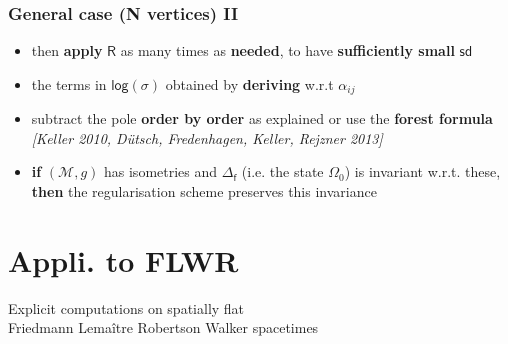 \documentclass[9pt]{beamer}
\newcommand{\logar}{\mathsf{log}} %
\newcommand{\sd}{\mathsf{sd}} %
\newcommand{\citebeam}[1]{\textit{\textcolor{black!60!white}{[#1]}}} %
\newcommand{\Mcal}{\mathcal{M}}
\newcommand{\Rsf}{\mathsf{R}}
\newcommand{\fsf}{\mathsf{f}}
\begin{document}
\begin{frame}
 
\frametitle{General case (N vertices) II}

\begin{itemize}
 
\item then \textbf{apply} $\Rsf$ as many times as \textbf{needed}, to have \textbf{sufficiently small} $\sd$ 

\item the terms in $\logar(\sigma)$ obtained by \textbf{deriving} w.r.t $\alpha_{ij}$

\item subtract the pole \textbf{order by order} as explained or use the \textbf{forest formula} \\
\citebeam{Keller 2010, Dütsch, Fredenhagen, Keller, Rejzner 2013}

\item \textbf{if} $(\Mcal,g)$ has isometries and $\Delta_\fsf$ (i.e. the state $\Omega_0$) is invariant w.r.t. these, \textbf{then} the regularisation scheme preserves this invariance
 
\end{itemize}

\end{frame}

\section{Appli. to FLWR}

{
\begin{frame}
\bf
\begin{exampleblock}{\vspace*{-3ex}}
\begin{center}
\Large Explicit computations on spatially flat \\[10pt] Friedmann Lemaître Robertson Walker spacetimes
\end{center}
\end{exampleblock}
\end{frame}
}

\end{document}
